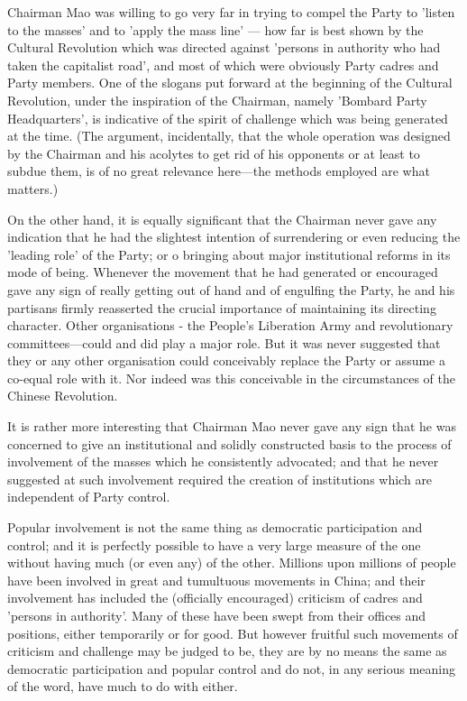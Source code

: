 Chairman Mao was willing to go very far in trying to compel the Party to 'listen to the masses' and to 'apply the mass line' — how far is best shown by the Cultural Revolution which was directed against 'persons in authority who had taken the capitalist road', and most of which were obviously Party cadres and Party members. One of the slogans put forward at the beginning of the Cultural Revolution, under the inspiration of the Chairman, namely 'Bombard Party Headquarters', is indicative of the spirit of challenge which was being generated at the time. (The argument, incidentally, that the whole operation was designed by the Chairman and his acolytes to get rid of his opponents or at least to subdue them, is of no great relevance here—the methods employed are what matters.)

On the other hand, it is equally significant that the Chairman never gave any indication that he had the slightest intention of surrendering or even reducing the 'leading role' of the Party; or o bringing about major institutional reforms in its mode of being. Whenever the movement that he had generated or encouraged gave any sign of really getting out of hand and of engulfing the Party, he and his partisans firmly reasserted the crucial importance of maintaining its directing character. Other organisations - the People's Liberation Army and revolutionary committees—could and did play a major role. But it was never suggested that they or any other organisation could conceivably replace the Party or assume a co-equal role with it. Nor indeed was this conceivable in the circumstances of the Chinese Revolution.

It is rather more interesting that Chairman Mao never gave any sign that he was concerned to give an institutional and solidly constructed basis to the process of involvement of the masses which he consistently advocated; and that he never suggested at such involvement required the creation of institutions which are independent of Party control.

Popular involvement is not the same thing as democratic participation and control; and it is perfectly possible to have a very large measure of the one without having much (or even any) of the other. Millions upon millions of people have been involved in great and tumultuous movements in China; and their involvement has included the (officially encouraged) criticism of cadres and 'persons in authority'. Many of these have been swept from their offices and positions, either temporarily or for good. But however fruitful such movements of criticism and challenge may be judged to be, they are by no means the same as democratic participation and popular control and do not, in any serious meaning of the word, have much to do with either.

